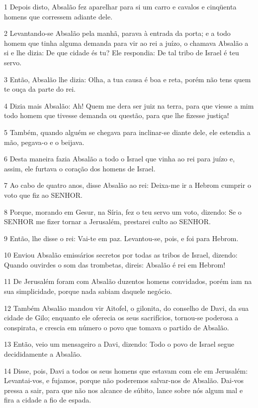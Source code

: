 \par 1 Depois disto, Absalão fez aparelhar para si um carro e cavalos e cinqüenta homens que corressem adiante dele.
\par 2 Levantando-se Absalão pela manhã, parava à entrada da porta; e a todo homem que tinha alguma demanda para vir ao rei a juízo, o chamava Absalão a si e lhe dizia: De que cidade és tu? Ele respondia: De tal tribo de Israel é teu servo.
\par 3 Então, Absalão lhe dizia: Olha, a tua causa é boa e reta, porém não tens quem te ouça da parte do rei.
\par 4 Dizia mais Absalão: Ah! Quem me dera ser juiz na terra, para que viesse a mim todo homem que tivesse demanda ou questão, para que lhe fizesse justiça!
\par 5 Também, quando alguém se chegava para inclinar-se diante dele, ele estendia a mão, pegava-o e o beijava.
\par 6 Desta maneira fazia Absalão a todo o Israel que vinha ao rei para juízo e, assim, ele furtava o coração dos homens de Israel.
\par 7 Ao cabo de quatro anos, disse Absalão ao rei: Deixa-me ir a Hebrom cumprir o voto que fiz ao SENHOR.
\par 8 Porque, morando em Gesur, na Síria, fez o teu servo um voto, dizendo: Se o SENHOR me fizer tornar a Jerusalém, prestarei culto ao SENHOR.
\par 9 Então, lhe disse o rei: Vai-te em paz. Levantou-se, pois, e foi para Hebrom.
\par 10 Enviou Absalão emissários secretos por todas as tribos de Israel, dizendo: Quando ouvirdes o som das trombetas, direis: Absalão é rei em Hebrom!
\par 11 De Jerusalém foram com Absalão duzentos homens convidados, porém iam na sua simplicidade, porque nada sabiam daquele negócio.
\par 12 Também Absalão mandou vir Aitofel, o gilonita, do conselho de Davi, da sua cidade de Gilo; enquanto ele oferecia os seus sacrifícios, tornou-se poderosa a conspirata, e crescia em número o povo que tomava o partido de Absalão.
\par 13 Então, veio um mensageiro a Davi, dizendo: Todo o povo de Israel segue decididamente a Absalão.
\par 14 Disse, pois, Davi a todos os seus homens que estavam com ele em Jerusalém: Levantai-vos, e fujamos, porque não poderemos salvar-nos de Absalão. Dai-vos pressa a sair, para que não nos alcance de súbito, lance sobre nós algum mal e fira a cidade a fio de espada.
